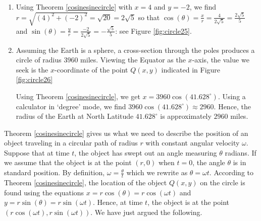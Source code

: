 {
\begin{enumerate}

\item  Using Theorem \ref{cosinesinecircle} with $x = 4$ and $y = -2$, we find $r = \sqrt{(4)^2 + (-2)^2} = \sqrt{20} = 2 \sqrt{5}$ so that $\cos(\theta) = \frac{x}{r} =  \frac{4}{2 \sqrt{5}} = \frac{2 \sqrt{5}}{5}$ and $\sin(\theta) = \frac{y}{r} =  \frac{-2}{2 \sqrt{5}} = -\frac{\sqrt{5}}{5}$: see Figure \ref{fig:circle25}.


\item  Assuming the Earth is a sphere, a cross-section through the poles produces a circle of radius $3960$ miles.  Viewing the Equator as the $x$-axis, the value we seek is the $x$-coordinate of the point $Q(x,y)$ indicated in Figure \ref{fig:circle26}
 
 
Using Theorem \ref{cosinesinecircle}, we get $x = 3960 \cos\left(41.628^{\circ}\right)$.  Using a calculator in `degree' mode,  we find  $3960 \cos\left(41.628^{\circ}\right) \approx 2960$.  Hence, the radius of the Earth at North Latitude $41.628^{\circ}$ is approximately $2960$ miles.

\end{enumerate}
}

\medskip

Theorem \ref{cosinesinecircle} gives us what we need to describe the position of an object traveling in a circular path of radius $r$ with constant angular velocity $\omega$.  Suppose that at time $t$, the object has swept out an angle measuring $\theta$ radians.  If we assume that the object is at the point $(r,0)$ when $t=0$, the angle $\theta$ is in standard position.  By definition, $\omega = \frac{\theta}{t}$ which we rewrite as  $\theta = \omega t$.  According to Theorem \ref{cosinesinecircle}, the location of the object $Q(x,y)$ on the circle is found using the equations  $x = r \cos(\theta) = r \cos(\omega t)$ and $y = r \sin(\theta) = r \sin(\omega t)$.  Hence, at time $t$, the object is at the point $(r \cos(\omega t), r \sin(\omega t))$.  We have just argued the following.


